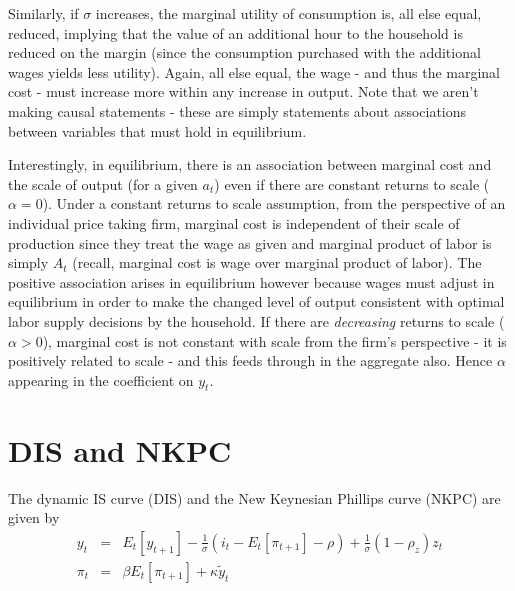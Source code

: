 \documentclass[authoryear,11pt]{elsarticle}
\begin{document}
Similarly, if $\sigma$ increases, the marginal utility of consumption is, all else equal, reduced, implying that the value of an additional hour to the household is reduced on the margin (since the consumption purchased with the additional wages yields less utility). Again, all else equal, the wage - and thus the marginal cost - must increase more within any increase in output. Note that we aren't making causal statements - these are simply statements about associations between variables that must hold in equilibrium.

Interestingly, in equilibrium, there is an association between marginal cost and the scale of output (for a given $a_{t}$) even if there are constant returns to scale ($\alpha=0$). Under a constant returns to scale assumption, from the perspective of an individual price taking firm, marginal cost is independent of their scale of production since they treat the wage as given and marginal product of labor is simply $A_{t}$ (recall, marginal cost is wage over marginal product of labor). The positive association arises in equilibrium however because wages must adjust in equilibrium in order to make the changed level of output consistent with optimal labor supply decisions by the household. If there are \emph{decreasing} returns to scale ($\alpha>0$), marginal cost is not constant with scale from the firm's perspective - it is positively related to scale - and this feeds through in the aggregate also. Hence $\alpha$ appearing in the coefficient on $y_{t}$.

\section{DIS and NKPC}
The dynamic IS curve (DIS) and the New Keynesian Phillips curve (NKPC) are given by
\begin{eqnarray*}
y_{t} &=& E_{t}[y_{t+1}] - \frac{1}{\sigma}(i_{t} - E_{t}[\pi_{t+1}] - \rho) + \frac{1}{\sigma}(1-\rho_{z})z_{t} \\
\pi_{t} &=& \beta E_{t}[ \pi_{t+1} ] + \kappa \tilde{y}_{t}
\end{eqnarray*}
\end{document}
